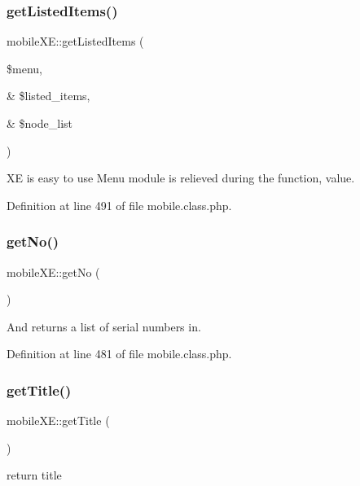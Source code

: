 \subsubsection{\texorpdfstring{get\+Listed\+Items()}{getListedItems()}}
{\footnotesize\ttfamily mobile\+X\+E\+::get\+Listed\+Items (\begin{DoxyParamCaption}\item[{}]{\$menu,  }\item[{\&}]{\$listed\+\_\+items,  }\item[{\&}]{\$node\+\_\+list }\end{DoxyParamCaption})}



XE is easy to use Menu module is relieved during the function, value. 



Definition at line 491 of file mobile.\+class.\+php.

\mbox{\label{classmobileXE_aea159c7670d0d25f3c770672f3dd0e66}} 
\subsubsection{\texorpdfstring{get\+No()}{getNo()}}
{\footnotesize\ttfamily mobile\+X\+E\+::get\+No (\begin{DoxyParamCaption}{ }\end{DoxyParamCaption})}



And returns a list of serial numbers in. 



Definition at line 481 of file mobile.\+class.\+php.

\mbox{\label{classmobileXE_ade6f26dcf994e29278983b5496767c14}} 
\subsubsection{\texorpdfstring{get\+Title()}{getTitle()}}
{\footnotesize\ttfamily mobile\+X\+E\+::get\+Title (\begin{DoxyParamCaption}{ }\end{DoxyParamCaption})}



return title 



